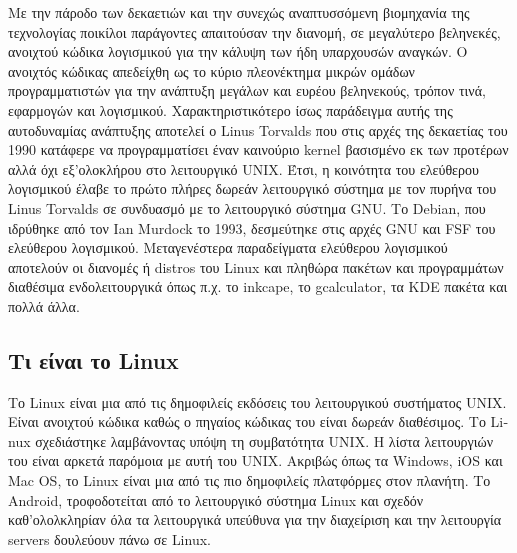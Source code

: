 \documentclass{article}
\begin{document}
{Με την πάροδο των δεκαετιών και την συνεχώς αναπτυσσόμενη βιομηχανία της τεχνολογίας ποικίλοι παράγοντες απαιτούσαν την διανομή, σε μεγαλύτερο βεληνεκές, ανοιχτού κώδικα λογισμικού για την κάλυψη των ήδη υπαρχουσών αναγκών. O ανοιχτός κώδικας απεδείχθη ως 
το κύριο πλεονέκτημα μικρών ομάδων προγραμματιστών για την ανάπτυξη μεγάλων και ευρέου βεληνεκούς, τρόπον τινά, εφαρμογών και λογισμικού. Χαρακτηριστικότερο ίσως παράδειγμα αυτής της αυτοδυναμίας ανάπτυξης αποτελεί ο \textlatin{Linus Torvalds} που 
στις αρχές της δεκαετίας του 1990 κατάφερε να προγραμματίσει έναν καινούριο \textlatin{kernel} βασισμένο εκ των προτέρων αλλά όχι εξ'ολοκλήρου στο λειτουργικό 
\textlatin{UNIX}. Έτσι, η κοινότητα του ελεύθερου λογισμικού έλαβε το πρώτο πλήρες δωρεάν λειτουργικό σύστημα με τον πυρήνα του \textlatin{Linus Torvalds} σε συνδυασμό με το λειτουργικό σύστημα \textlatin{GNU}. Το \textlatin{Debian}, που ιδρύθηκε από τον \textlatin{Ian Murdock} το 1993, δεσμεύτηκε στις αρχές \textlatin{GNU} και \textlatin{FSF} του ελεύθερου λογισμικού. Μεταγενέστερα παραδείγματα ελεύθερου λογισμικού αποτελούν οι διανομές ή \textlatin{distros} του \textlatin{Linux} και πληθώρα πακέτων και προγραμμάτων διαθέσιμα ενδολειτουργικά όπως π.χ. το \textlatin{inkcape}, το \textlatin{gcalculator}, τα \textlatin{KDE} πακέτα και πολλά άλλα.

\subsection{Τι είναι το  \textlatin{Linux}}


Το \textlatin{Linux} είναι μια από τις δημοφιλείς εκδόσεις του λειτουργικού συστήματος \textlatin{UNIX}. Είναι ανοιχτού κώδικα καθώς ο πηγαίος κώδικας του είναι δωρεάν διαθέσιμος. Το \textlatin{Linux} σχεδιάστηκε λαμβάνοντας υπόψη τη συμβατότητα \textlatin{UNIX}. Η λίστα λειτουργιών του είναι αρκετά παρόμοια με αυτή του \textlatin{UNIX}. Ακριβώς όπως τα \textlatin{Windows}, \textlatin{iOS} και \textlatin{Mac OS}, το \textlatin{Linux} είναι μια από τις πιο δημοφιλείς πλατφόρμες στον πλανήτη. Το \textlatin{Android}, τροφοδοτείται από το λειτουργικό σύστημα \textlatin{Linux} και σχεδόν καθ'ολολκληρίαν όλα τα λειτουργικά υπεύθυνα για την διαχείριση και την λειτουργία \textlatin{servers} δουλεύουν πάνω σε \textlatin{Linux}. 

}
\end{document}
